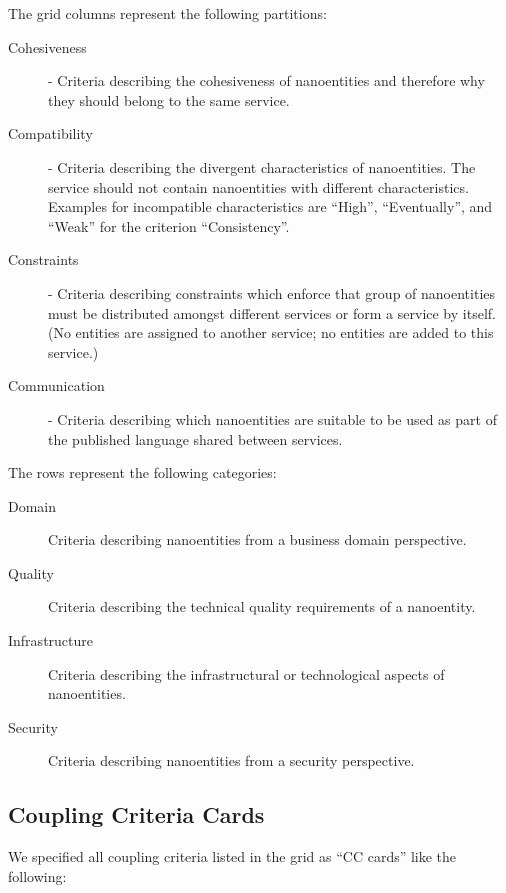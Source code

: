 The grid columns represent the following partitions:

\begin{description}
	\item[Cohesiveness] - Criteria describing the cohesiveness of nanoentities and therefore why they should belong to the same service. 
	\item[Compatibility] - Criteria describing the divergent characteristics of nanoentities. The service should not contain nanoentities with different characteristics. Examples for incompatible characteristics are \enquote{High}, \enquote{Eventually}, and \enquote{Weak} for the criterion \enquote{Consistency}.
	\item[Constraints] - Criteria describing constraints which enforce that group of nanoentities must be distributed amongst different services or form a service by itself. (No entities are assigned to another service; no entities are added to this service.)
	\item[Communication] - Criteria describing which nanoentities are suitable to be used as part of the published language shared between services. 
\end{description}

The rows represent the following categories:

\begin{description}
	\item[Domain] Criteria describing nanoentities from a business domain perspective.
	\item[Quality] Criteria describing the technical quality requirements of a nanoentity.  
	\item[Infrastructure] Criteria describing the infrastructural or technological aspects of nanoentities. %
	\item[Security] Criteria describing nanoentities from a security perspective.
\end{description}


\subsection{Coupling Criteria Cards}

We specified all coupling criteria listed in the grid as \enquote{CC cards} like the following:

